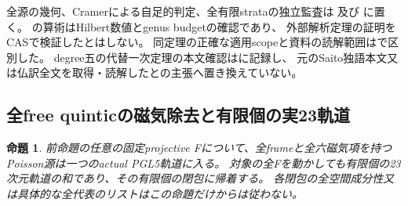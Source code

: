 \documentclass[a4paper,11pt]{ltjsarticle}
\newtheorem{proposition}{命題}[section]
\theoremstyle{definition}
\begin{document}
全源の幾何、Cramerによる自足的判定、全有限strataの独立監査は
及び
に置く。
の算術はHilbert数値とgenus budgetの確認であり、
外部解析定理の証明をCASで検証したとはしない。
同定理の正確な適用scopeと資料の読解範囲はで区別した。
degree五の代替一次定理の本文確認はに記録し、
元のSaito独語本文又は仏訳全文を取得・読解したとの主張へ置き換えていない。

\subsection{全free quinticの磁気除去と有限個の実23軌道}
\begin{proposition}\label{prop:essential-three-magnetic-finite-orbits}
前命題の任意の固定projective Fについて、全frameと全六磁気項を持つPoisson源は一つのactual PGL5軌道に入る。
対象の全Fを動かしても有限個の23次元軌道の和であり、その有限個の閉包に帰着する。
各閉包の全空間成分性又は具体的な全代表のリストはこの命題だけからは従わない。
\end{proposition}
\end{document}
